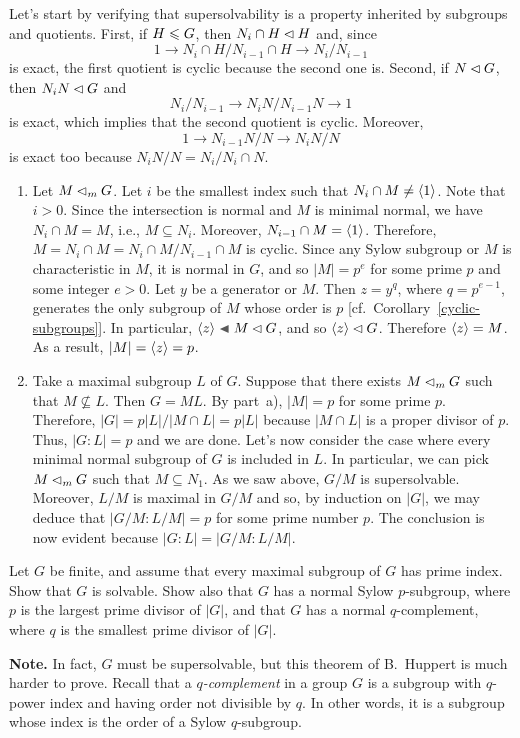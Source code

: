 \begin{solution} Let's start by verifying that supersolvability is a property inherited by subgroups and quotients. First, if $H\leqslant G$, then $N_i\cap H\lhd H$ and, since 
$$
    1\to N_i\cap H/N_{i-1}\cap H \to N_i/N_{i-1}
$$
is exact, the first quotient is cyclic because the second one is. Second, if $N\lhd G$, then $N_iN\lhd G$ and
$$
    N_i/N_{i-1}\to N_iN/N_{i-1}N\to1
$$
is exact, which implies that the second quotient is cyclic. Moreover,
$$
    1\to N_{i-1}N/N \to N_iN/N
$$
is exact too because $N_iN/N=N_i/N_i\cap N$.

\begin{enumerate}[\rm a)]
    \item Let $M\lhd_m G$. Let $i$ be the smallest index such that $N_i\cap M\ne\langle1\rangle$. Note that $i>0$. Since the intersection is normal and $M$ is minimal normal, we have $N_i\cap M=M$, i.e., $M\subseteq N_i$. Moreover, $N_{i-1}\cap M=\langle1\rangle$. Therefore, $M=N_i\cap M=N_i\cap M/N_{i-1}\cap M$ is cyclic. Since any Sylow subgroup or $M$ is characteristic in $M$, it is normal in $G$, and so $|M|=p^e$ for some prime $p$ and some integer $e>0$. Let $y$ be a generator or $M$. Then $z=y^q$, where $q=p^{e-1}$, generates the only subgroup of $M$ whose order is $p$ [cf.~Corollary~\ref{cyclic-subgroups}]. In particular, $\gen z\ch M\normal G$, and so $\langle z\rangle\lhd G$. Therefore $\langle z\rangle=M$. As a result, $|M|=\langle z\rangle=p$.

    \item Take a maximal subgroup $L$ of $G$. Suppose that there exists $M\lhd_mG$ such that $M\not\subseteq L$. Then $G=ML$. By part~a), $|M|=p$ for some prime $p$. Therefore, $|G|=p|L|/|M\cap L|=p|L|$ because $|M\cap L|$ is a proper divisor of $p$. Thus, $|G:L|=p$ and we are done. Let's now consider the case where every minimal normal subgroup of $G$ is included in $L$. In particular, we can pick $M\lhd_mG$ such that $M\subseteq N_1$. As we saw above, $G/M$ is supersolvable. Moreover, $L/M$ is maximal in $G/M$ and so, by induction on $|G|$, we may deduce that $|G/M:L/M|=p$ for some prime number $p$. The conclusion is now evident because $|G:L|=|G/M:L/M|$.
\end{enumerate}
\end{solution}

\begin{probl}\label{problem-3.B.8}
    Let\/ $G$ be finite, and assume that every maximal subgroup of\/ $G$ has prime index. Show that\/ $G$ is solvable. Show also that\/ $G$ has a normal Sylow\/ $p$-subgroup, where\/ $p$ is the largest prime divisor of\/ $|G|$, and that\/ $G$ has a normal\/ $q$-complement, where\/ $q$ is the smallest prime divisor of\/ $|G|$.

    \textrm{\rm\textbf{Note.} In fact, $G$ must be supersolvable, but this theorem of B.~Huppert is much harder to prove. Recall that a \textsl{$q$-complement} in a group $G$ is a subgroup with $q$-power index and having order not divisible by $q$. In other words, it is a subgroup whose index is the order of a Sylow $q$-subgroup.}
\end{probl}

